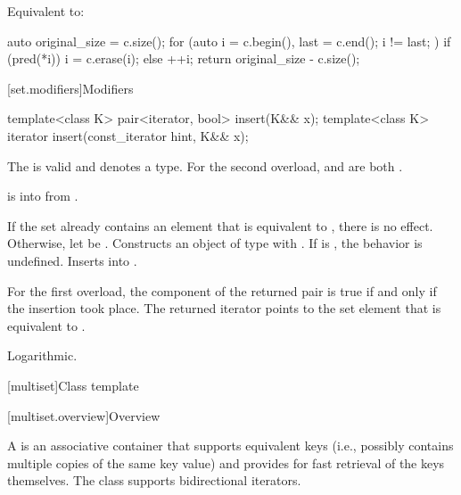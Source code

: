 \begin{itemdescr}
\pnum
\effects
Equivalent to:
\begin{codeblock}
auto original_size = c.size();
for (auto i = c.begin(), last = c.end(); i != last; ) {
  if (pred(*i)) {
    i = c.erase(i);
  } else {
    ++i;
  }
}
return original_size - c.size();
\end{codeblock}
\end{itemdescr}

[set.modifiers]{Modifiers}

%
\begin{itemdecl}
template<class K> pair<iterator, bool> insert(K&& x);
template<class K> iterator insert(const_iterator hint, K&& x);
\end{itemdecl}

\begin{itemdescr}
\pnum
\constraints
The  
is valid and denotes a type.
For the second overload,
 and
 are both .

\pnum
\expects
{} is  into  from
.

\pnum
\effects
If the set already contains an element that is equivalent to ,
there is no effect.
Otherwise, let  be .
Constructs an object  of type 
with .
If  is , the behavior is undefined.
Inserts  into .

\pnum
\returns
For the first overload,
the  component of the returned pair is true
if and only if the insertion took place.
The returned iterator points to the set element that is equivalent to .

\pnum
\complexity
Logarithmic.
\end{itemdescr}

[multiset]{Class template }

[multiset.overview]{Overview}

\pnum
{}%
A
is an associative container that supports equivalent keys (i.e., possibly contains multiple copies of
the same key value) and provides for fast retrieval of the keys themselves.
The
 class
supports bidirectional iterators.

